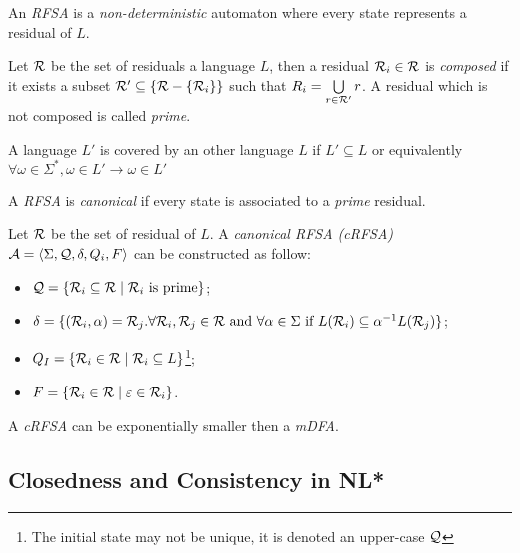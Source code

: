 \begin{definition}
  An \textit{RFSA} is a \textit{non-deterministic} automaton where every state represents a residual of $L$.
\end{definition}

\begin{definition}
  Let $\mathcal{R}$ be the set of residuals a language $L$, then a residual $\mathcal{R}_i \in \mathcal{R}$ is \textit{composed} if it exists a subset $\mathcal{R}' \subseteq \{\mathcal{R} - \{\mathcal{R}_i\}\}$ such that $R_i = \bigcup\limits_{r \in \mathcal{R}'}r$. A residual which is not composed is called \textit{prime}.
\end{definition}

\begin{definition}
  A language $L'$ is covered by an other language $L$ if $L' \subseteq L$ or equivalently $\forall \omega \in \Sigma^*, \omega \in L' \rightarrow \omega \in L'$
\end{definition}

\begin{definition}
  A \textit{RFSA} is \textit{canonical} if every state is associated to a \textit{prime} residual.
\end{definition}

Let $\mathcal{R}$ be the set of residual of $L$. A \textit{canonical RFSA (cRFSA)} $\mathcal{A} = \langle \Sigma, \mathcal{Q}, \delta, Q_i, F \rangle$ can be constructed as follow:
\begin{itemize}
  \item $\mathcal{Q} = \{\mathcal{R}_i \subseteq  \mathcal{R} \mid \mathcal{R}_i \text{ is prime}\}$;
  \item $\delta = \{(\mathcal{R}_i, \alpha) = \mathcal{R}_j. \forall \mathcal{R}_i, \mathcal{R}_j \in \mathcal{R} \text{ and } \forall \alpha \in \Sigma \text{ if } L(\mathcal{R}_i) \subseteq \alpha^{-1}L(\mathcal{R}_j)\}$;
  \item $Q_I = \{\mathcal{R}_i \in \mathcal{R} \mid \mathcal{R}_i \subseteq L\}$\footnote{The initial state may not be unique, it is denoted an upper-case $\mathcal{Q}$};
  \item $F = \{\mathcal{R}_i \in \mathcal{R} \mid \varepsilon \in \mathcal{R}_i\}$.
\end{itemize}

\begin{theorem}
  A \textit{cRFSA} can be exponentially smaller then a \textit{mDFA}.
\end{theorem}

\subsection{Closedness and Consistency in NL*}

